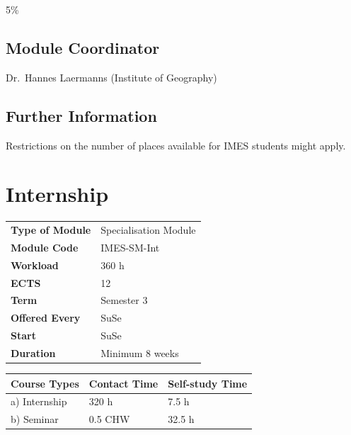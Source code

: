 \documentclass[
  letterpaper,
  10pt,
  openany]{book}
\begin{document}

5\%

\section*{Module Coordinator}\label{module-coordinator-5}


Dr.~Hannes Laermanns (Institute of Geography)

\section*{Further Information}\label{further-information-5}


Restrictions on the number of places available for IMES students might
apply.

\chapter*{Internship}\label{internship}


\begin{longtable}[]{@{}ll@{}}
\toprule\noalign{}
\endhead
\bottomrule\noalign{}
\endlastfoot
\textbf{Type of Module} & Specialisation Module \\
\textbf{Module Code} & IMES-SM-Int \\
\textbf{Workload} & 360 h \\
\textbf{ECTS} & 12 \\
\textbf{Term} & Semester 3 \\
\textbf{Offered Every} & SuSe \\
\textbf{Start} & SuSe \\
\textbf{Duration} & Minimum 8 weeks \\
\end{longtable}

\begin{longtable}[]{@{}lll@{}}
\toprule\noalign{}
Course Types & Contact Time & Self-study Time \\
\midrule\noalign{}
\endhead
\bottomrule\noalign{}
\endlastfoot
a) Internship & 320 h & 7.5 h \\
b) Seminar & 0.5 CHW & 32.5 h \\
\end{longtable}
\end{document}
